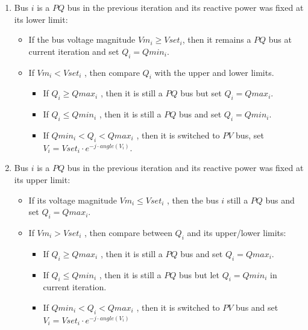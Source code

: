 \documentclass[nols,a4paper,twoside,notoc,fleqn]{tufte-book}
\begin{document}
\begin{enumerate}
	\item Bus $i$ is a $PQ$ bus in the previous iteration and its
	reactive power was fixed at its lower limit:
	
	\begin{itemize}
		\item If the bus voltage magnitude $Vm_i \geq Vset_i$, then it remains a $PQ$ bus at current iteration and set $Q_i = Qmin_i$.
		
		\item If $Vm_i < Vset_i$ , then compare $Q_i$ with the upper and lower limits.
		
		\begin{itemize}
			\item If $Q_i \geq Qmax_i$ , then it is still a $PQ$ bus but set $Q_i = Qmax_i$.
			
			\item If $Q_i \leq Qmin_i$ , then it is still a $PQ$ bus and set $Q_i = Qmin_i$.
			
			\item If $Qmin_i < Q_i < Qmax_i$ , then it is switched to $PV$ bus, set $V_i = Vset_i \cdot e^{-j \cdot angle(V_i)}$.
		\end{itemize}
	\end{itemize}
	
	
	\item Bus $i$ is a $PQ$ bus in the previous iteration and its reactive power was fixed at its upper limit:
	
	\begin{itemize}
		\item If its voltage magnitude $Vm_i \leq Vset_i$ , then the bus $i$ still a $PQ$ bus and set $Q_i = Qmax_i$.
	
		\item If $Vm_i > Vset_i$ , then compare between $Q_i$ and its upper/lower limits:
	
		\begin{itemize}
			\item If $Q_i \geq Qmax_i$ , then it is still a $PQ$ bus and set $Q_i = Qmax_i$.
			\item If $Q_i \leq Qmin_i$ , then it is still a $PQ$ bus but let $Q_i = Qmin_i$ in current iteration.
			\item If $Qmin_i < Q_i < Qmax_i$ , then it is switched to $PV$ bus and set $V_i = Vset_i \cdot e^{-j \cdot angle(V_i)}$
		\end{itemize}
	\end{itemize}
	

\end{enumerate}
\end{document}
